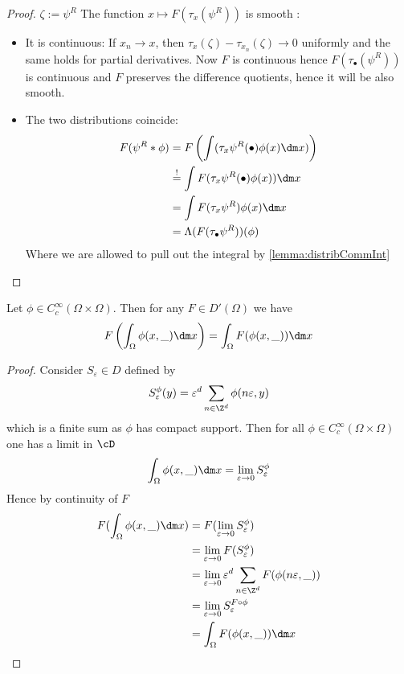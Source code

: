 \begin{proof}
	$\zeta := \psi^R$
	The function $x \mapsto F(\tau_x(\psi^R))$ is smooth :
	\begin{itemize}
		\item It is continuous: If $x_n \to x$, then $\tau_x (\zeta) - \tau_{x_n}(\zeta) \to 0 $ uniformly and the same holds for partial derivatives. Now $F$ is continuous hence $F(\tau_{\bullet}(\psi^R))$ is continuous and $F$ preserves the difference quotients, hence it will be also smooth.
		\item The two distributions coincide:
		\begin{align*}
			F(\psi^R * \phi)  &= F \left(\int(\tau_x \psi^R(\bullet) \phi(x) \dm x) \right) \\
			&\overset{!}{=} \int F(\tau_x \psi^R(\bullet) \phi(x)) \dm x \\
			&= \int F(\tau_x \psi^R) \phi(x) \dm x \\
			&= \Lambda(F(\tau_{\bullet} \psi^R))(\phi)
		\end{align*}
		Where we are allowed to pull out the integral by \ref{lemma:distribCommInt}
	\end{itemize}
\end{proof}
\begin{lemma}{\label{lemma:distribCommInt}}
	Let $\phi \in C_c^{\infty}(\Omega \times \Omega)$. Then for any $F \in D'(\Omega)$ we have
	\[
	F \left(\int_\Omega \phi(x,\_) \dm x \right) = \int_\Omega F(\phi(x ,\_)) \dm x
	\]
\end{lemma}
\begin{proof}
	Consider $S_\varepsilon \in D$ defined by
	\[S_\varepsilon^\phi(y) = \varepsilon^d \sum_{n \in \Z^d} \phi(n \varepsilon,y)\]
	which is a finite sum as $\phi$ has compact support.
	Then for all $\phi \in C_c^\infty(\Omega \times \Omega)$ one has a limit in $\cD$
	\[
	\int_\Omega \phi(x,\_) \dm x = \lim_{\varepsilon \to 0} S^\phi_\varepsilon
	\]
	Hence by continuity of $F$
	\begin{align*}
		F(\int_\Omega \phi(x,\_) \dm x) &= F(\lim_{\varepsilon \to 0} S^\phi_\varepsilon)     \\
		&= \lim_{\varepsilon \to 0} F(S^{\phi}_\varepsilon)     \\
		&= \lim_{\varepsilon \to 0} \varepsilon^d \sum_{n \in \Z^d} F(\phi(n \varepsilon,\_))     \\
		&= \lim_{\varepsilon \to 0} S^{F \circ \phi}_\varepsilon \\
		&= \int_\Omega F(\phi(x,\_)) \dm x
	\end{align*}
\end{proof}
